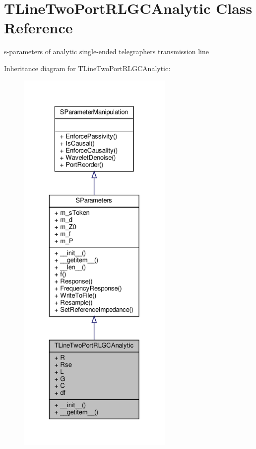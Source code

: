 \hypertarget{classSignalIntegrity_1_1SParameters_1_1Devices_1_1TLineTwoPortRLGCAnalytic_1_1TLineTwoPortRLGCAnalytic}{}\section{T\+Line\+Two\+Port\+R\+L\+G\+C\+Analytic Class Reference}
\label{classSignalIntegrity_1_1SParameters_1_1Devices_1_1TLineTwoPortRLGCAnalytic_1_1TLineTwoPortRLGCAnalytic}


s-\/parameters of analytic single-\/ended telegraphers transmission line  




Inheritance diagram for T\+Line\+Two\+Port\+R\+L\+G\+C\+Analytic\+:
\nopagebreak
\begin{figure}[H]
\begin{center}
\leavevmode
\includegraphics[height=550pt]{classSignalIntegrity_1_1SParameters_1_1Devices_1_1TLineTwoPortRLGCAnalytic_1_1TLineTwoPortRLGCAnalytic__inherit__graph}
\end{center}
\end{figure}


